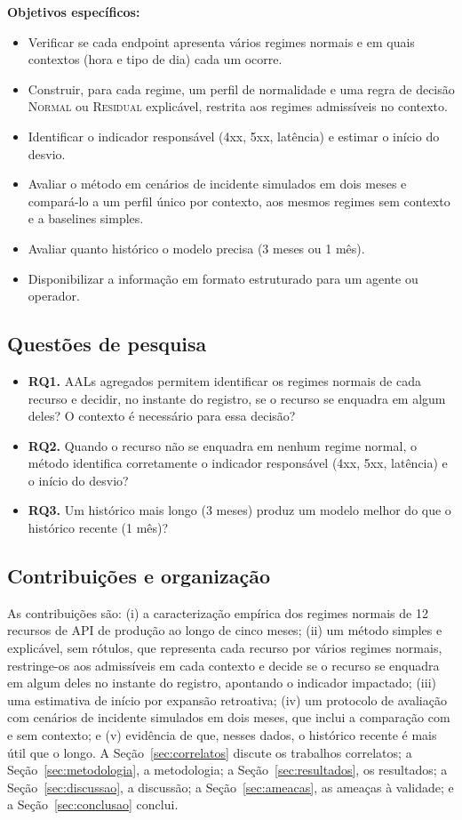 \documentclass[sigconf,nonacm]{acmart}
\newcommand{\Normal}{\textsc{Normal}\xspace}
\newcommand{\Residual}{\textsc{Residual}\xspace}
\begin{document}
\textbf{Objetivos específicos:}
\begin{itemize}
  \item Verificar se cada endpoint apresenta vários regimes normais e em quais contextos (hora e tipo de dia) cada um ocorre.
  \item Construir, para cada regime, um perfil de normalidade e uma regra de decisão \Normal ou \Residual explicável, restrita aos regimes admissíveis no contexto.
  \item Identificar o indicador responsável (4xx, 5xx, latência) e estimar o início do desvio.
  \item Avaliar o método em cenários de incidente simulados em dois meses e compará-lo a um perfil único por contexto, aos mesmos regimes sem contexto e a baselines simples.
  \item Avaliar quanto histórico o modelo precisa (3 meses ou 1 mês).
  \item Disponibilizar a informação em formato estruturado para um agente ou operador.
\end{itemize}

\subsection{Questões de pesquisa}
\begin{itemize}
  \item \textbf{RQ1.} AALs agregados permitem identificar os regimes normais de cada recurso e decidir, no instante do registro, se o recurso se enquadra em algum deles? O contexto é necessário para essa decisão?
  \item \textbf{RQ2.} Quando o recurso não se enquadra em nenhum regime normal, o método identifica corretamente o indicador responsável (4xx, 5xx, latência) e o início do desvio?
  \item \textbf{RQ3.} Um histórico mais longo (3 meses) produz um modelo melhor do que o histórico recente (1 mês)?
\end{itemize}

\subsection{Contribuições e organização}
As contribuições são: (i) a caracterização empírica dos regimes normais de 12 recursos de API de produção ao longo de cinco meses; (ii) um método simples e explicável, sem rótulos, que representa cada recurso por vários regimes normais, restringe-os aos admissíveis em cada contexto e decide se o recurso se enquadra em algum deles no instante do registro, apontando o indicador impactado; (iii) uma estimativa de início por expansão retroativa; (iv) um protocolo de avaliação com cenários de incidente simulados em dois meses, que inclui a comparação com e sem contexto; e (v) evidência de que, nesses dados, o histórico recente é mais útil que o longo. A Seção~\ref{sec:correlatos} discute os trabalhos correlatos; a Seção~\ref{sec:metodologia}, a metodologia; a Seção~\ref{sec:resultados}, os resultados; a Seção~\ref{sec:discussao}, a discussão; a Seção~\ref{sec:ameacas}, as ameaças à validade; e a Seção~\ref{sec:conclusao} conclui.
\end{document}
